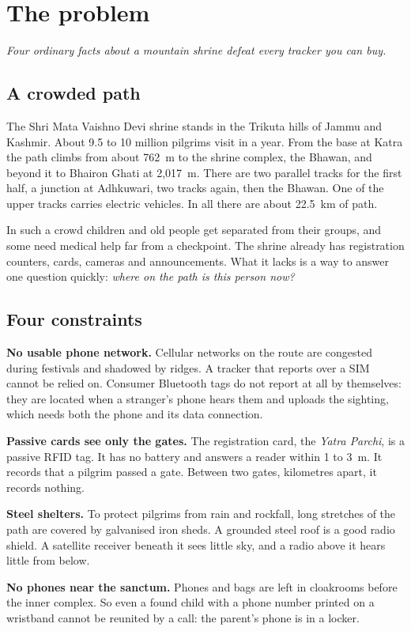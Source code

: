\documentclass[11pt,a4paper,twoside,openany]{book}
\newcommand{\hook}[1]{{\noindent\fontsize{13}{19}\selectfont\itshape\color{rsmuted}#1\par}\vspace{12pt}}
\begin{document}
\chapter{The problem}\label{ch:problem}
\hook{Four ordinary facts about a mountain shrine defeat every tracker you can buy.}
\section{A crowded path}
The Shri Mata Vaishno Devi shrine stands in the Trikuta hills of Jammu and Kashmir. About 9.5 to 10 million pilgrims
visit in a year. From the base at Katra the path climbs from about 762~m to the shrine complex, the Bhawan, and beyond
it to Bhairon Ghati at 2,017~m. There are two parallel tracks for the first half, a junction at Adhkuwari, two tracks
again, then the Bhawan. One of the upper tracks carries electric vehicles. In all there are about 22.5~km of path.

In such a crowd children and old people get separated from their groups, and some need medical help far from a
checkpoint. The shrine already has registration counters, cards, cameras and announcements. What it lacks is a way to
answer one question quickly: \emph{where on the path is this person now?}

\section{Four constraints}
\textbf{No usable phone network.} Cellular networks on the route are congested during festivals and shadowed by ridges.
A tracker that reports over a SIM cannot be relied on. Consumer Bluetooth tags do not report at all by themselves: they
are located when a stranger's phone hears them and uploads the sighting, which needs both the phone and its data
connection.

\textbf{Passive cards see only the gates.} The registration card, the \emph{Yatra Parchi}, is a passive RFID tag. It
has no battery and answers a reader within 1 to 3~m. It records that a pilgrim passed a gate. Between two gates,
kilometres apart, it records nothing.

\textbf{Steel shelters.} To protect pilgrims from rain and rockfall, long stretches of the path are covered by
galvanised iron sheds. A grounded steel roof is a good radio shield. A satellite receiver beneath it sees little sky,
and a radio above it hears little from below.

\textbf{No phones near the sanctum.} Phones and bags are left in cloakrooms before the inner complex. So even a found
child with a phone number printed on a wristband cannot be reunited by a call: the parent's phone is in a locker.
\end{document}
